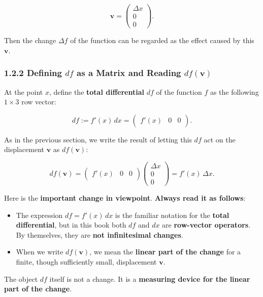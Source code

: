 \documentclass[a4paper,12pt,openany]{book}
\begin{document}
\[
\mathbf{v}=\begin{pmatrix}\Delta x\\0\\0\end{pmatrix}.
\]

Then the change \(\Delta f\) of the function can be regarded as the
effect caused by this \(\mathbf{v}\).

\hypertarget{defining-df-as-a-matrix-and-reading-dfmathbfv}{%
\subsubsection{\texorpdfstring{1.2.2 Defining \(df\) as a Matrix and
Reading
\(df(\mathbf{v})\)}{1.2.2 Defining df as a Matrix and Reading df(\textbackslash mathbf\{v\})}}\label{defining-df-as-a-matrix-and-reading-dfmathbfv}}

At the point \(x\), define the \textbf{total differential} \(df\) of the
function \(f\) as the following \(1\times3\) row vector:

\[
df:=f'(x)\,dx=\begin{pmatrix}f'(x)&0&0\end{pmatrix}.
\]

As in the previous section, we write the result of letting this \(df\)
act on the displacement \(\mathbf{v}\) as \(df(\mathbf{v})\):

\[
df(\mathbf{v})=
\begin{pmatrix}f'(x)&0&0\end{pmatrix}
\begin{pmatrix}\Delta x\\0\\0\end{pmatrix}
=f'(x)\,\Delta x.
\]

Here is the \textbf{important change in viewpoint}.
\textbf{Always read it as follows}:

\begin{itemize}
\item
  The expression \(df=f'(x)\,dx\) is the familiar notation for the
  \textbf{total differential}, but in this book both \(df\) and \(dx\)
  are \textbf{row-vector operators}. By themselves, they are
  \textbf{not infinitesimal changes}.
\item
  When we write \(df(\mathbf{v})\), we mean the
  \textbf{linear part of the change} for a finite, though sufficiently
  small, displacement \(\mathbf{v}\).
\end{itemize}

The object \(df\) itself is not a change. It is a
\textbf{measuring device for the linear part of the change}.
\end{document}
